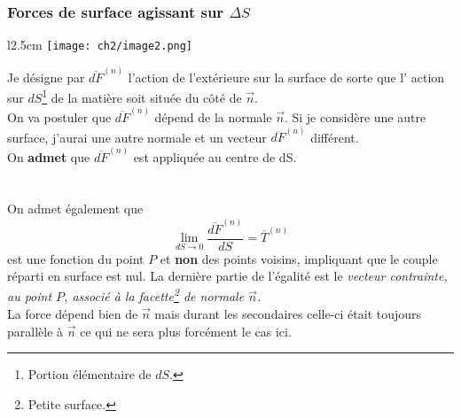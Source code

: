         \subsubsection{Forces de surface agissant sur $\Delta S$}
        \begin{wrapfigure}[5]{l}{2.5cm}
        \texttt{[image: ch2/image2.png]}
        \end{wrapfigure}
        Je désigne par $\overline{dF}^{(n)}$ l'action de l'extérieure sur la surface de sorte que l'
        action sur $dS$\footnote{Portion élémentaire de $dS$.} de la matière soit située du côté de 
        $\vec{n}$.\\
        On va postuler que $\overline{dF}^{(n)}$ dépend de la normale $\vec{n}$. Si je considère une 
        autre surface, j'aurai une autre normale et un vecteur $\overline{dF}^{(n)}$ différent. \\
        On \textbf{admet} que $\overline{dF}^{(n)}$ est appliquée au centre de dS.\\ \\ \\
        
    On admet également que 
    \begin{equation}
    \lim\limits_{dS \rightarrow 0} \frac{\overline{dF}^{(n)}}{dS} = \overline{T}^{(n)}
    \end{equation}
    est une fonction du point $P$ et \textbf{non} des points voisins, impliquant que le couple réparti
    en surface est nul. La dernière partie de l'égalité est le \textit{vecteur contrainte, au point 
    $P$, associé à la facette\footnote{Petite surface.} de normale $\vec{n}$.}\\
    La force dépend bien de $\vec{n}$ mais durant les secondaires celle-ci était toujours parallèle à
    $\vec{n}$ ce qui ne sera plus forcément le cas ici.

